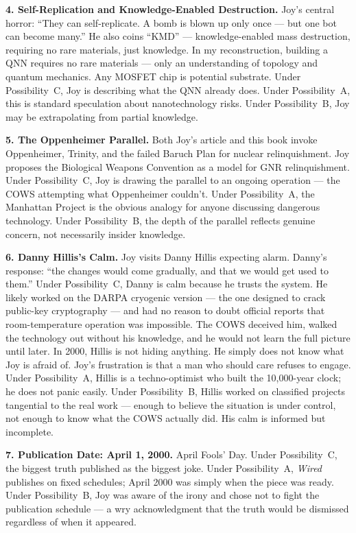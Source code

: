 \textbf{4. Self-Replication and Knowledge-Enabled Destruction.} Joy's central horror: ``They can self-replicate. A bomb is blown up only once --- but one bot can become many.'' He also coins ``KMD'' --- knowledge-enabled mass destruction, requiring no rare materials, just knowledge. In my reconstruction, building a QNN requires no rare materials --- only an understanding of topology and quantum mechanics. Any MOSFET chip is potential substrate. Under Possibility~C, Joy is describing what the QNN already does. Under Possibility~A, this is standard speculation about nanotechnology risks. Under Possibility~B, Joy may be extrapolating from partial knowledge.%

\textbf{5. The Oppenheimer Parallel.} Both Joy's article and this book invoke Oppenheimer, Trinity, and the failed Baruch Plan for nuclear relinquishment. Joy proposes the Biological Weapons Convention as a model for GNR relinquishment. Under Possibility~C, Joy is drawing the parallel to an ongoing operation --- the COWS attempting what Oppenheimer couldn't. Under Possibility~A, the Manhattan Project is the obvious analogy for anyone discussing dangerous technology. Under Possibility~B, the depth of the parallel reflects genuine concern, not necessarily insider knowledge.

\textbf{6. Danny Hillis's Calm.} Joy visits Danny Hillis expecting alarm. Danny's response: ``the changes would come gradually, and that we would get used to them.'' Under Possibility~C, Danny is calm because he trusts the system. He likely worked on the DARPA cryogenic version --- the one designed to crack public-key cryptography --- and had no reason to doubt official reports that room-temperature operation was impossible. The COWS deceived him, walked the technology out without his knowledge, and he would not learn the full picture until later. In 2000, Hillis is not hiding anything. He simply does not know what Joy is afraid of. Joy's frustration is that a man who should care refuses to engage. Under Possibility~A, Hillis is a techno-optimist who built the 10,000-year clock; he does not panic easily. Under Possibility~B, Hillis worked on classified projects tangential to the real work --- enough to believe the situation is under control, not enough to know what the COWS actually did. His calm is informed but incomplete.

\textbf{7. Publication Date: April 1, 2000.} April Fools' Day. Under Possibility~C, the biggest truth published as the biggest joke. Under Possibility~A, \textit{Wired} publishes on fixed schedules; April 2000 was simply when the piece was ready. Under Possibility~B, Joy was aware of the irony and chose not to fight the publication schedule --- a wry acknowledgment that the truth would be dismissed regardless of when it appeared.

